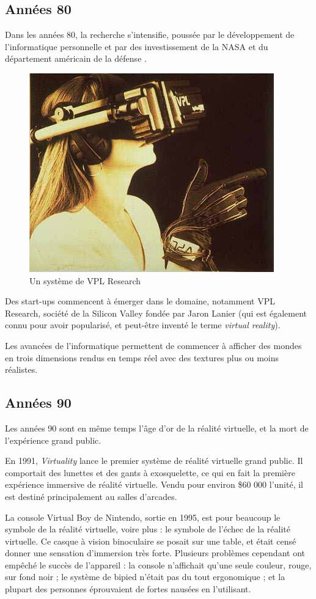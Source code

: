 \documentclass[a4,12pt]{scrartcl}
\begin{document}
\subsection{Années 80}

Dans les années 80, la recherche s'intensifie, poussée par le développement de l’informatique personnelle et  par des investissement de la NASA et du département américain de la défense \cite{theverge14}.

\begin{figure}[H]
	\centering
	\includegraphics[width=0.6\linewidth]{vpl-hmd}
	\caption{Un système de VPL Research}
\end{figure}

Des start-ups commencent à émerger dans le domaine, notamment VPL Research, société de la Silicon Valley fondée par Jaron Lanier (qui est également connu pour avoir popularisé, et peut-être inventé le terme \emph{virtual reality}).

Les avancées de l'informatique permettent de commencer à afficher des mondes en trois dimensions rendus en temps réel avec des textures plus ou moins réalistes.

\subsection{Années 90}

Les années 90 sont en même temps l'âge d'or de la réalité virtuelle, et la mort de l'expérience grand public.

En 1991, \emph{Virtuality} lance le premier système de réalité virtuelle grand public. Il comportait des lunettes et des gants à exosquelette, ce qui en fait la première expérience immersive de réalité virtuelle. Vendu pour environ \$60 000 l'unité, il est destiné principalement au salles d'arcades.


La console Virtual Boy de Nintendo, sortie en 1995, est pour beaucoup le symbole de la réalité virtuelle, voire plus : le symbole de l'échec de la réalité virtuelle. Ce casque à vision binoculaire se posait sur une table, et était censé donner une sensation d'immersion très forte. Plusieurs problèmes cependant ont empêché le succès de l'appareil : la console n'affichait qu'une seule couleur, rouge, sur fond noir ; le système de bipied n'était pas du tout ergonomique ; et la plupart des personnes éprouvaient de fortes nausées en l'utilisant.
\end{document}
